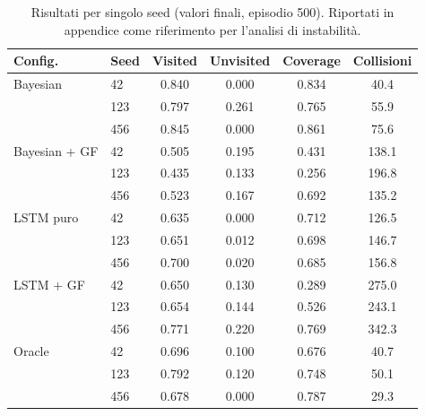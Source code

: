 \begin{table}[ht]
\centering\small
\caption{Risultati per singolo seed (valori finali, episodio 500). Riportati in appendice come riferimento per l'analisi di instabilità.}
\label{tab:results_per_seed}
\begin{tabular}{llcccc}
\toprule
\textbf{Config.} & \textbf{Seed} & \textbf{Visited} & \textbf{Unvisited} & \textbf{Coverage} & \textbf{Collisioni} \\
\midrule
Bayesian & 42 & 0.840 & 0.000 & 0.834 & 40.4 \\
 & 123 & 0.797 & 0.261 & 0.765 & 55.9 \\
 & 456 & 0.845 & 0.000 & 0.861 & 75.6 \\
\midrule
Bayesian + GF & 42 & 0.505 & 0.195 & 0.431 & 138.1 \\
 & 123 & 0.435 & 0.133 & 0.256 & 196.8 \\
 & 456 & 0.523 & 0.167 & 0.692 & 135.2 \\
\midrule
LSTM puro & 42 & 0.635 & 0.000 & 0.712 & 126.5 \\
 & 123 & 0.651 & 0.012 & 0.698 & 146.7 \\
 & 456 & 0.700 & 0.020 & 0.685 & 156.8 \\
\midrule
LSTM + GF & 42 & 0.650 & 0.130 & 0.289 & 275.0 \\
 & 123 & 0.654 & 0.144 & 0.526 & 243.1 \\
 & 456 & 0.771 & 0.220 & 0.769 & 342.3 \\
\midrule
Oracle & 42 & 0.696 & 0.100 & 0.676 & 40.7 \\
 & 123 & 0.792 & 0.120 & 0.748 & 50.1 \\
 & 456 & 0.678 & 0.000 & 0.787 & 29.3 \\
\bottomrule
\end{tabular}
\end{table}